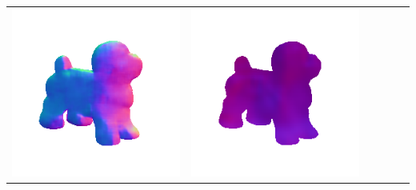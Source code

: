 \begin{center}
\begin{tabularx}{\linewidth}{@{}Y@{}Y@{}Y@{}Y@{}Y@{}Y@{}}
\includegraphics[width=\linewidth]{semisynthetic/20150514_17_marrnet_out.png} &
\includegraphics[width=\linewidth]{semisynthetic/20150514_17_ef_out.png} \\

\end{tabularx}
\end{center}
